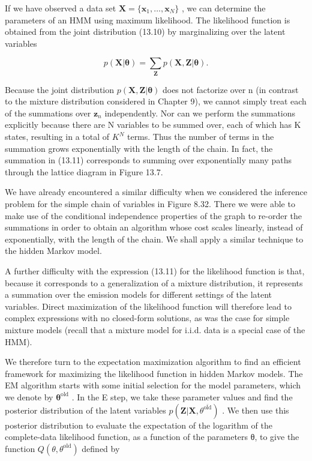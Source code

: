\documentclass[
  10
]{article}
\begin{document}
If we have observed a data set
\(\mathbf { X } = \{ \mathbf { x } _ { 1 } , \ldots , \mathbf { x } _ { N } \}\)
, we can determine the parameters of an HMM using maximum likelihood.
The likelihood function is obtained from the joint distribution (13.10)
by marginalizing over the latent variables

\[
p (\mathbf {X} | \boldsymbol {\theta}) = \sum_ {\mathbf {Z}} p (\mathbf {X}, \mathbf {Z} | \boldsymbol {\theta}).\tag{13.11}
\]

Because the joint distribution
\(p ( \mathbf { X } , \mathbf { Z } | \boldsymbol { \theta } )\) does
not factorize over n (in contrast to the mixture distribution considered
in Chapter 9), we cannot simply treat each of the summations over
\(\mathbf { z } _ { n }\) independently. Nor can we perform the
summations explicitly because there are N variables to be summed over,
each of which has K states, resulting in a total of \(K ^ { N }\) terms.
Thus the number of terms in the summation grows exponentially with the
length of the chain. In fact, the summation in (13.11) corresponds to
summing over exponentially many paths through the lattice diagram in
Figure 13.7.

We have already encountered a similar difficulty when we considered the
inference problem for the simple chain of variables in Figure 8.32.
There we were able to make use of the conditional independence
properties of the graph to re-order the summations in order to obtain an
algorithm whose cost scales linearly, instead of exponentially, with the
length of the chain. We shall apply a similar technique to the hidden
Markov model.

A further difficulty with the expression (13.11) for the likelihood
function is that, because it corresponds to a generalization of a
mixture distribution, it represents a summation over the emission models
for different settings of the latent variables. Direct maximization of
the likelihood function will therefore lead to complex expressions with
no closed-form solutions, as was the case for simple mixture models
(recall that a mixture model for i.i.d. data is a special case of the
HMM).

We therefore turn to the expectation maximization algorithm to find an
efficient framework for maximizing the likelihood function in hidden
Markov models. The EM algorithm starts with some initial selection for
the model parameters, which we denote by
\(\pmb { \theta } ^ { \mathrm { o l d } }\) . In the E step, we take
these parameter values and find the posterior distribution of the latent
variables
\(p ( \mathbf { Z } | \mathbf { X } , \theta ^ { \mathrm { { \bar { o l d } } } } )\)
. We then use this posterior distribution to evaluate the expectation of
the logarithm of the complete-data likelihood function, as a function of
the parameters θ, to give the function
\(Q ( \theta , \theta ^ { \mathrm { o l d } } )\) defined by
\end{document}
